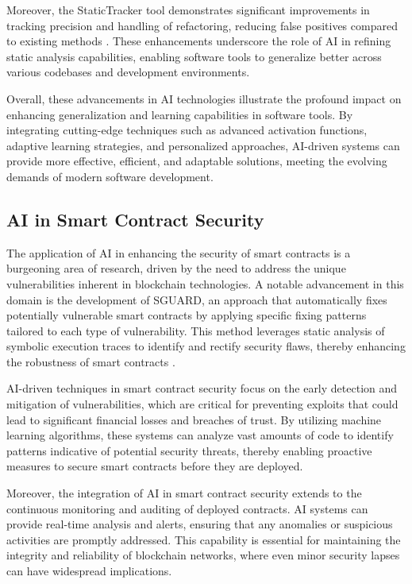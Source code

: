 Moreover, the StaticTracker tool demonstrates significant improvements in tracking precision and handling of refactoring, reducing false positives compared to existing methods \cite{li2024trackingevolutionstaticcode}. These enhancements underscore the role of AI in refining static analysis capabilities, enabling software tools to generalize better across various codebases and development environments.



Overall, these advancements in AI technologies illustrate the profound impact on enhancing generalization and learning capabilities in software tools. By integrating cutting-edge techniques such as advanced activation functions, adaptive learning strategies, and personalized approaches, AI-driven systems can provide more effective, efficient, and adaptable solutions, meeting the evolving demands of modern software development.



\subsection{AI in Smart Contract Security} \label{subsec:AI in Smart Contract Security}

The application of AI in enhancing the security of smart contracts is a burgeoning area of research, driven by the need to address the unique vulnerabilities inherent in blockchain technologies. A notable advancement in this domain is the development of SGUARD, an approach that automatically fixes potentially vulnerable smart contracts by applying specific fixing patterns tailored to each type of vulnerability. This method leverages static analysis of symbolic execution traces to identify and rectify security flaws, thereby enhancing the robustness of smart contracts \cite{nguyen2021sguardfixingvulnerablesmart}.



AI-driven techniques in smart contract security focus on the early detection and mitigation of vulnerabilities, which are critical for preventing exploits that could lead to significant financial losses and breaches of trust. By utilizing machine learning algorithms, these systems can analyze vast amounts of code to identify patterns indicative of potential security threats, thereby enabling proactive measures to secure smart contracts before they are deployed.



Moreover, the integration of AI in smart contract security extends to the continuous monitoring and auditing of deployed contracts. AI systems can provide real-time analysis and alerts, ensuring that any anomalies or suspicious activities are promptly addressed. This capability is essential for maintaining the integrity and reliability of blockchain networks, where even minor security lapses can have widespread implications.



